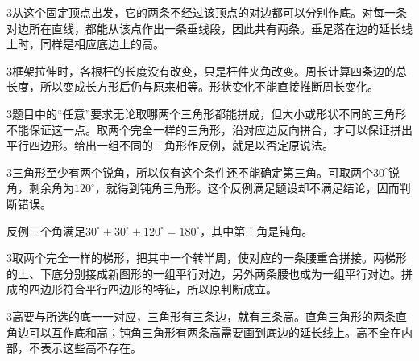 \documentclass[multi=snippet,border={5bp 20bp 5bp 5bp}]{standalone}
\newenvironment{snippet}[3]{\begin{minipage}{#1bp}\color{answerred}\fontsize{#2}{#3}\selectfont\raggedright}{\end{minipage}}
\begin{document}
\begin{snippet}{505}{11.5}{14}\begin{multicols}{3}\raggedcolumns 从这个固定顶点出发，它的两条不经过该顶点的对边都可以分别作底。对每一条对边所在直线，都能从该点作出一条垂线段，因此共有两条。垂足落在边的延长线上时，同样是相应底边上的高。\end{multicols}\end{snippet}
\begin{snippet}{505}{11.5}{14}\begin{multicols}{3}\raggedcolumns 框架拉伸时，各根杆的长度没有改变，只是杆件夹角改变。周长计算四条边的总长度，所以变成长方形后仍与原来相等。形状变化不能直接推断周长变化。\end{multicols}\end{snippet}
\begin{snippet}{505}{11.5}{14}\begin{multicols}{3}\raggedcolumns 题目中的“任意”要求无论取哪两个三角形都能拼成，但大小或形状不同的三角形不能保证这一点。取两个完全一样的三角形，沿对应边反向拼合，才可以保证拼出平行四边形。给出一组不同的三角形作反例，就足以否定原说法。\end{multicols}\end{snippet}
\begin{snippet}{505}{11.5}{14}\begin{multicols}{3}\raggedcolumns 三角形至少有两个锐角，所以仅有这个条件还不能确定第三角。可取两个\(30^\circ\)\allowbreak 锐角，剩余角为\(120^\circ\)\allowbreak ，就得到钝角三角形。这个反例满足题设却不满足结论，因而判断错误。\par 反例三个角满足\(30^\circ+30^\circ+120^\circ=180^\circ\)\allowbreak ，其中第三角是钝角。\end{multicols}\end{snippet}
\begin{snippet}{505}{11.5}{14}\begin{multicols}{3}\raggedcolumns 取两个完全一样的梯形，把其中一个转半周，使对应的一条腰重合拼接。两梯形的上、下底分别接成新图形的一组平行对边，另外两条腰也成为一组平行对边。拼成的四边形符合平行四边形的特征，所以原判断成立。\end{multicols}\end{snippet}
\begin{snippet}{505}{11.5}{14}\begin{multicols}{3}\raggedcolumns 高要与所选的底一一对应，三角形有三条边，就有三条高。直角三角形的两条直角边可以互作底和高；钝角三角形有两条高需要画到底边的延长线上。高不全在内部，不表示这些高不存在。\end{multicols}\end{snippet}
\end{document}
